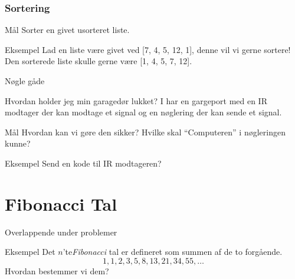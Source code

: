 \documentclass[12pt,t]{beamer}
\begin{document}
        \begin{frame}
          \frametitle{Sortering}
          \begin{block}{Mål}
              Sorter en givet usorteret liste.
          \end{block}
          \pause

          \begin{exampleblock}{Eksempel}
          Lad en liste være givet ved [7, 4, 5, 12, 1], denne vil vi gerne sortere!
          Den sorterede liste skulle gerne være [1, 4, 5, 7, 12].
          \end{exampleblock}
        \end{frame}


        \begin{frame}{Nøgle gåde}
        \begin{block}{Hvordan holder jeg min garagedør lukket?}
            I har en gargeport med en IR modtager der kan modtage et
            signal og en nøglering der kan sende et signal.
        \end{block}\pause
          \begin{block}{Mål}
            Hvordan kan vi gøre den sikker? Hvilke skal ``Computeren'' i
            nøgleringen kunne?
          \end{block}
          \pause
          \begin{exampleblock}{Eksempel}
            Send en kode til IR modtageren?
          \end{exampleblock}
        \end{frame}


    \section{Fibonacci Tal}
        \begin{frame}[c]{Overlappende under problemer}
            \begin{block}{Eksempel}
                Det $n$'te\emph{Fibonacci} tal er defineret som summen af de to
                forgående.
                $$
                  1,1,2,3,5,8,13,21,34,55, \dots
                $$
                \pause
                Hvordan bestemmer vi dem?
            \end{block}
        \end{frame}
\end{document}
